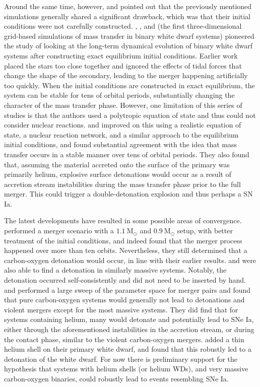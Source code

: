 \documentclass[iop]{../emulateapj}
\newcommand{\msolar}{\mathrm{M}_\odot}
\begin{document}
Around the same time, however, \cite{guillochon:2010} and
\cite{dan:2011} pointed out that the previously mentioned simulations 
generally shared a significant drawback, which was that their initial conditions
were not carefully constructed. \cite{motl:2002}, \cite{dsouza:2006},
and \cite{motl:2007} (the first three-dimensional grid-based
simulations of mass transfer in binary white dwarf systems) pioneered
the study of looking at the long-term dynamical evolution of binary
white dwarf systems after constructing exact equilibrium initial
conditions. Earlier work placed the stars too close together 
and ignored the effects of tidal forces that change the shape of the 
secondary, leading to the merger
happening artificially too quickly. When the initial conditions are
constructed in exact equilibrium, the system can be stable for tens of
orbital periods, substantially changing the character of the mass
transfer phase. However, one limitation of this series of studies is
that the authors used a polytropic equation of state and thus could
not consider nuclear reactions. \cite{guillochon:2010} and
\cite{dan:2011} improved on this using a realistic equation of state,
a nuclear reaction network, and a similar approach to the equilibrium
initial conditions, and found substantial agreement with the idea that
mass transfer occurs in a stable manner over tens of orbital
periods. They also found that, assuming the material accreted onto the
surface of the primary was primarily helium, explosive surface
detonations would occur as a result of accretion stream instabilities
during the mass transfer phase prior to the full merger. This could
trigger a double-detonation explosion and thus perhaps a SN Ia.

The latest developments have resulted in some possible areas of convergence.
\cite{pakmor:2012} performed a merger scenario
with a $1.1\ \msolar$ and $0.9\ \msolar$ setup, with better treatment
of the initial conditions, and indeed found that the merger process
happened over more than ten orbits. Nevertheless, they still determined
that a carbon-oxygen detonation would occur, in line with their
earlier results. \cite{moll:2014} and \cite{kashyap:2015} were also 
able to find a detonation in similarly massive systems. Notably,
the detonation occurred self-consistently and did not need to be inserted 
by hand. \cite{dan:2012} and \cite{dan:2014} performed a large sweep 
of the parameter space for merger pairs and
found that pure carbon-oxygen systems would generally not lead to
detonations and violent mergers except for the most massive
systems. They did find that for systems containing helium, many
would detonate and potentially lead to SNe Ia, either through the
aforementioned instabilities in the accretion stream, or during the
contact phase, similar to the violent carbon-oxygen
mergers. \cite{pakmor:2013} added a thin helium shell on their primary
white dwarf, and found that this robustly led to a detonation of the
white dwarf. For now there is preliminary support for the hypothesis
that systems with helium shells (or helium WDs), and very massive carbon-oxygen binaries,
could robustly lead to events resembling SNe Ia.
\end{document}
